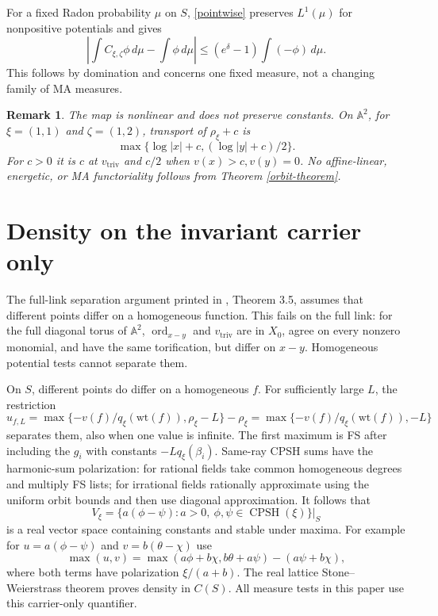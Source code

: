 \documentclass[11pt]{article}
\newtheorem{remark}[theorem]{Remark}
\newcommand{\CPSH}{\operatorname{CPSH}}
\newcommand{\triv}{\mathrm{triv}}
\begin{document}
For a fixed Radon probability $\mu$ on $S$, \eqref{pointwise} preserves $L^1(\mu)$ for nonpositive potentials and gives
\begin{equation}\label{integration}
 \left|\int C_{\xi,\zeta}\phi\,d\mu-\int\phi\,d\mu\right|
 \leq(e^\delta-1)\int(-\phi)\,d\mu.
\end{equation}
This follows by domination and concerns one fixed measure, not a changing family of MA measures.

\begin{remark}
The map is nonlinear and does not preserve constants.
On $\mathbb A^2$, for $\xi=(1,1)$ and $\zeta=(1,2)$, transport of $\rho_\xi+c$ is
\[
 \max\{\log|x|+c,(\log|y|+c)/2\}.
\]
For $c>0$ it is $c$ at $v_\triv$ and $c/2$ when $v(x)>c,v(y)=0$.
No affine-linear, energetic, or MA functoriality follows from Theorem \ref{orbit-theorem}.
\end{remark}

\section{Density on the invariant carrier only}
The full-link separation argument printed in \cite{YW24}, Theorem 3.5, assumes that different points differ on a homogeneous function.
This fails on the full link: for the full diagonal torus of $\mathbb A^2$, $\operatorname{ord}_{x-y}$ and $v_\triv$ are in $X_0$, agree on every nonzero monomial, and have the same torification, but differ on $x-y$.
Homogeneous potential tests cannot separate them.

On $S$, different points do differ on a homogeneous $f$.
For sufficiently large $L$, the restriction
\[
 u_{f,L}=\max\{-v(f)/q_\xi(\mathrm{wt}(f)),\rho_\xi-L\}-\rho_\xi
       =\max\{-v(f)/q_\xi(\mathrm{wt}(f)),-L\}
\]
separates them, also when one value is infinite.
The first maximum is FS after including the $g_i$ with constants $-Lq_\xi(\beta_i)$.
Same-ray CPSH sums have the harmonic-sum polarization: for rational fields take common homogeneous degrees and multiply FS lists; for irrational fields rationally approximate using the uniform orbit bounds and then use diagonal approximation.
It follows that
\[
 V_\xi=\{a(\phi-\psi):a>0,\ \phi,\psi\in\CPSH(\xi)\}|_S
\]
is a real vector space containing constants and stable under maxima.
For example for $u=a(\phi-\psi)$ and $v=b(\theta-\chi)$ use
\[
 \max(u,v)=\max(a\phi+b\chi,b\theta+a\psi)-(a\psi+b\chi),
\]
where both terms have polarization $\xi/(a+b)$.
The real lattice Stone--Weierstrass theorem proves density in $C(S)$.
All measure tests in this paper use this carrier-only quantifier.
\end{document}
